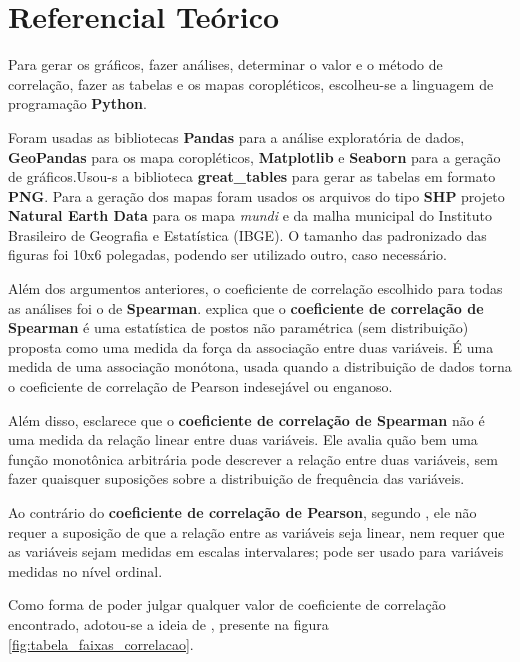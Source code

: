 \chapter{Referencial Teórico}

Para gerar os gráficos, fazer análises, determinar o valor e o método de correlação, fazer as tabelas e os mapas coropléticos, escolheu-se a linguagem de programação \textbf{Python}.

Foram usadas as bibliotecas \textbf{Pandas} para a análise exploratória de dados, \textbf{GeoPandas} para os mapa coropléticos, \textbf{Matplotlib} e \textbf{Seaborn} para a geração  de gráficos.Usou-s a biblioteca \textbf{great\_tables} para gerar as tabelas em formato \textbf{PNG}. Para a geração dos mapas foram usados os arquivos do tipo \textbf{SHP} projeto \textbf{Natural Earth Data} para os mapa \textit{mundi} e da malha municipal do Instituto Brasileiro de Geografia e Estatística (IBGE). O tamanho das padronizado das figuras foi 10x6 polegadas, podendo ser utilizado outro, caso necessário.

Além dos argumentos anteriores, o coeficiente de correlação escolhido para todas as análises foi o de \textbf{Spearman}. \cite{hauke2011comparison} explica que o \textbf{coeficiente de correlação de Spearman} é uma estatística de postos não paramétrica (sem distribuição) proposta como uma medida da força da associação entre duas variáveis. É uma medida de uma associação monótona, usada quando a distribuição de dados torna o coeficiente de correlação de Pearson indesejável ou enganoso. 

Além disso, \cite{hauke2011comparison} esclarece que o \textbf{coeficiente de correlação de Spearman} não é uma medida da relação linear entre duas variáveis. Ele avalia quão bem uma função monotônica arbitrária pode descrever a relação entre duas variáveis, sem fazer quaisquer suposições sobre a distribuição de frequência das variáveis.

Ao contrário do \textbf{coeficiente de correlação de Pearson}, segundo \cite{hauke2011comparison}, ele não requer a suposição de que a relação entre as variáveis seja linear, nem requer que as variáveis sejam medidas em escalas intervalares; pode ser usado para variáveis medidas no nível ordinal.

Como forma de poder julgar qualquer valor de coeficiente de correlação encontrado, adotou-se a ideia de \cite{ali2022spearman}, presente na figura \ref{fig:tabela_faixas_correlacao}.


